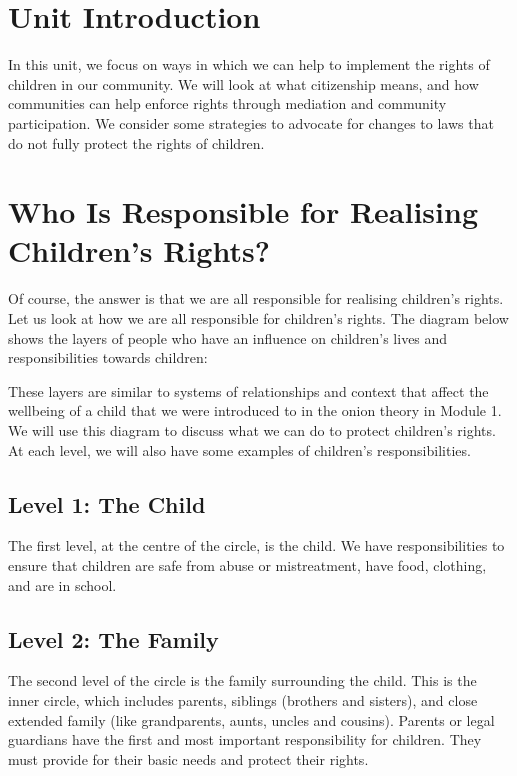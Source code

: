 \documentclass[12pt,a4paper]{article}
\begin{document}
\section*{Unit Introduction}
In this unit, we focus on ways in which we can help to implement the rights of children in our community. We will look at what citizenship means, and how communities can help enforce rights through mediation and community participation. We consider some strategies to advocate for changes to laws that do not fully protect the rights of children.

\section*{Who Is Responsible for Realising Children’s Rights?}
Of course, the answer is that we are all responsible for realising children’s rights. Let us look at how we are all responsible for children’s rights. The diagram below shows the layers of people who have an influence on children’s lives and responsibilities towards children:


These layers are similar to systems of relationships and context that affect the wellbeing of a child that we were introduced to in the onion theory in Module 1. We will use this diagram to discuss what we can do to protect children’s rights. At each level, we will also have some examples of children’s responsibilities.

\subsection*{Level 1: The Child}
The first level, at the centre of the circle, is the child. We have responsibilities to ensure that children are safe from abuse or mistreatment, have food, clothing, and are in school.

\subsection*{Level 2: The Family}
The second level of the circle is the family surrounding the child. This is the inner circle, which includes parents, siblings (brothers and sisters), and close extended family (like grandparents, aunts, uncles and cousins). Parents or legal guardians have the first and most important responsibility for children. They must provide for their basic needs and protect their rights.
\end{document}
